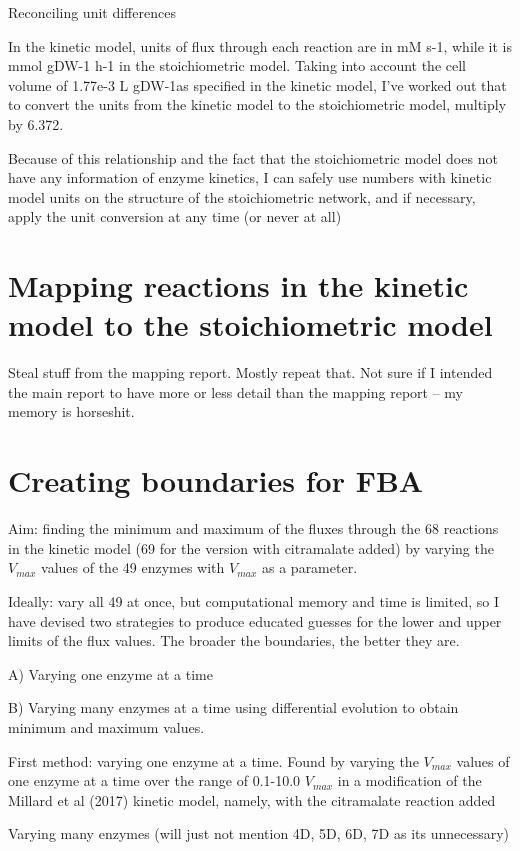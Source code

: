 \documentclass[parskip=full]{scrreprt}
\begin{document}
Reconciling unit differences

In the kinetic model, units of flux through each reaction are in mM s-1, while it is mmol gDW-1 h-1 in the stoichiometric model. Taking into account the cell volume of 1.77e-3 L gDW-1as specified in the kinetic model, I’ve worked out that to convert the units from the kinetic model to the stoichiometric model, multiply by 6.372.

Because of this relationship and the fact that the stoichiometric model does not have any information of enzyme kinetics, I can safely use numbers with kinetic model units on the structure of the stoichiometric network, and if necessary, apply the unit conversion at any time (or never at all)

\section{Mapping reactions in the kinetic model to the stoichiometric model}
\label{sec:mapping}

Steal stuff from the mapping report. Mostly repeat that. Not sure if I intended the main report to have more or less detail than the mapping report -- my memory is horseshit.

\section{Creating boundaries for FBA}
\label{sec:bounds}

Aim: finding the minimum and maximum of the fluxes through the 68 reactions in the kinetic model (69 for the version with citramalate added) by varying the $V_{max}$ values of the 49 enzymes with $V_{max}$ as a parameter.

Ideally: vary all 49 at once, but computational memory and time is limited, so I have devised two strategies to produce educated guesses for the lower and upper limits of the flux values. The broader the boundaries, the better they are.

A) Varying one enzyme at a time

B) Varying many enzymes at a time using differential evolution to obtain minimum and maximum values.

First method: varying one enzyme at a time. Found by varying the $V_{max}$ values of one enzyme at a time over the range of 0.1-10.0 $V_{max}$ in a modification of the Millard et al (2017) kinetic model, namely, with the citramalate reaction added

Varying many enzymes (will just not mention 4D, 5D, 6D, 7D as its unnecessary)
\end{document}
